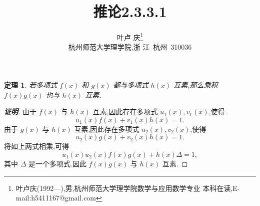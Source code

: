 \documentclass[twoside,11pt]{article}
\newtheorem{theorem}{定理}
\begin{document}
\title{\huge{\bf{推论2.3.3.1}}} \author{\small{叶卢
    庆\footnote{叶卢庆(1992---),男,杭州师范大学理学院数学与应用数学专业
      本科在读,E-mail:h5411167@gmail.com}}\\{\small{杭州师范大学理学院,浙
      江~杭州~310036}}} \date{}
\maketitle





\vspace{30pt} %

\begin{theorem}
  若多项式 $f(x)$ 和 $g(x)$ 都与多项式 $h(x)$ 互素,那么乘积 $f(x)g(x)$
  也与 $h(x)$ 互素.
\end{theorem}
\begin{proof}[\textbf{证明}]
由于 $f(x)$ 与 $h(x)$ 互素,因此存在多项式 $u_1(x),v_1(x)$,使得
$$
u_1(x)f(x)+v_1(x)h(x)=1.
$$
由于 $g(x)$ 与 $h(x)$ 互素,因此存在多项式 $u_2(x),v_2(x)$,使得
$$
u_2(x)g(x)+v_2(x)h(x)=1.
$$
将如上两式相乘,可得
$$
u_1(x)u_2(x)f(x)g(x)+h(x)\Delta =1,
$$
其中 $\Delta $ 是一个多项式.因此 $f(x)g(x)$ 与 $h(x)$ 互素.  
\end{proof}
% 
\begin{thebibliography}{}
\end{thebibliography}
\end{document}
